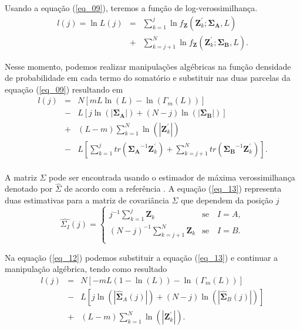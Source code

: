 \documentclass[conference]{IEEEtran}
\begin{document}
Usando a equação (\ref{eq_09}), teremos a  função de log-verossimilhança.
\begin{equation}
\begin{array}{rcl}\label{eq_11}
	l(j)=\ln L(j)&=&\sum_{k=1}^{j}\ln f_{\mathbf{Z}}(\mathbf{Z}_{k}^{'};\mathbf{\Sigma_{A}},L)\\
	             &+&\sum_{k=j+1}^{N}\ln f_{\mathbf{Z}}(\mathbf{Z}_{k}^{'};\mathbf{\Sigma_{B}},L).
\end{array}
\end{equation}

Nesse momento, podemos realizar  manipulações algébricas na função densidade de probabilidade em cada termo do somatório e substituir nas duas parcelas da equação (\ref{eq_09}) resultando em
\begin{equation}
\begin{array}{lll}\label{eq_12}
	l(j)&=&N\left[mL\ln{\left(L\right)}-\ln{\left(\Gamma_m(L)\right)}\right]\\
	&-& L\left[j\ln{\left(|\mathbf{\Sigma_{A}}|\right)}+(N-j)\ln{\left(|\mathbf{\Sigma_{B}}|\right)}\right] \\
	&+&(L-m)\sum_{k=1}^{N}\ln{\left(|\mathbf{Z}_{k}^{'}|\right)}\\
	&-&L\left[\sum_{k=1}^{j}tr(\mathbf{\Sigma_{A}}^{-1}\mathbf{Z}_{k}^{'})+ \sum_{k=j+1}^{N}tr(\mathbf{\Sigma_{B}}^{-1}\mathbf{Z}_{k}^{'})\right]. \\
\end{array}
\end{equation}

A matriz $\Sigma$ pode ser encontrada usando o estimador de máxima verossimilhança denotado por $\widehat{\Sigma}$ de acordo com a referência \cite{good}. A equação (\ref{eq_13}) representa duas estimativas para a matriz de covariância $\Sigma$ que dependem da posição $j$
\begin{equation}\label{eq_13}
\widehat{\Sigma_{I}}(j) = \left\{
\begin{array}{lc}
	j^{-1}\sum_{k=1}^{j}\mathbf{Z}_{k}  & \mbox{se}\quad I=A,  \\
        (N-j)^{-1}\sum_{k=j+1}^{N}\mathbf{Z}_{k} & \mbox{se}\quad I=B. \\
\end{array}
\right.
\end{equation}

Na equação (\ref{eq_12}) podemos substituir a equação (\ref{eq_13}) e continuar a manipulação algébrica, tendo como resultado 
\begin{equation}\label{eq_14}
\begin{array}{rcl}
	l(j)&=&N\left[-mL(1-\ln{\left(L\right)})-\ln{\left(\Gamma_m(L)\right)}\right]\\
	&-&L\left[j\ln{\left(|\mathbf{\widehat{\Sigma}}_{A}(j)|\right)} +(N-j)\ln{\left(|\mathbf{\widehat{\Sigma}}_{B}(j)|\right)}\right]\\
	&+&(L-m)\sum_{k=1}^{N}\ln{\left(|\mathbf{Z}_{k}^{'}|\right)}. \\
\end{array}
\end{equation}
\end{document}
